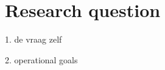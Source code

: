
\chapter{Research question} %
\label{chp:research_question}

1. de vraag zelf

2. operational goals

\lipsum[2]
